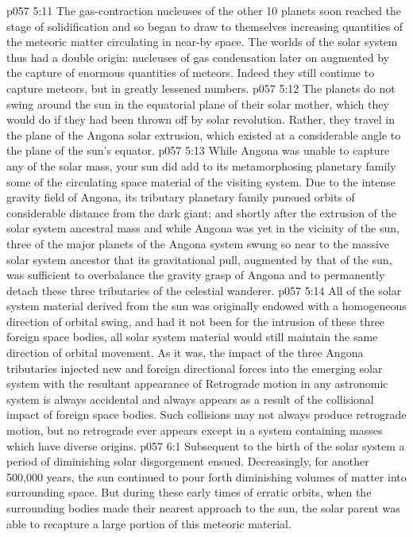 \vs p057 5:11 The gas\hyp{}contraction nucleuses of the other 10 planets soon reached the stage of solidification and so began to draw to themselves increasing quantities of the meteoric matter circulating in near\hyp{}by space. The worlds of the solar system thus had a double origin: nucleuses of gas condensation later on augmented by the capture of enormous quantities of meteors. Indeed they still continue to capture meteors, but in greatly lessened numbers.
\vs p057 5:12 The planets do not swing around the sun in the equatorial plane of their solar mother, which they would do if they had been thrown off by solar revolution. Rather, they travel in the plane of the Angona solar extrusion, which existed at a considerable angle to the plane of the sun’s equator.
\vs p057 5:13 \pc While Angona was unable to capture any of the solar mass, your sun did add to its metamorphosing planetary family some of the circulating space material of the visiting system. Due to the intense gravity field of Angona, its tributary planetary family pursued orbits of considerable distance from the dark giant; and shortly after the extrusion of the solar system ancestral mass and while Angona was yet in the vicinity of the sun, three of the major planets of the Angona system swung so near to the massive solar system ancestor that its gravitational pull, augmented by that of the sun, was sufficient to overbalance the gravity grasp of Angona and to permanently detach these three tributaries of the celestial wanderer.
\vs p057 5:14 All of the solar system material derived from the sun was originally endowed with a homogeneous direction of orbital swing, and had it not been for the intrusion of these three foreign space bodies, all solar system material would still maintain the same direction of orbital movement. As it was, the impact of the three Angona tributaries injected new and foreign directional forces into the emerging solar system with the resultant appearance of  Retrograde motion in any astronomic system is always accidental and always appears as a result of the collisional impact of foreign space bodies. Such collisions may not always produce retrograde motion, but no retrograde ever appears except in a system containing masses which have diverse origins.
\vs p057 6:1 Subsequent to the birth of the solar system a period of diminishing solar disgorgement ensued. Decreasingly, for another 500,000 years, the sun continued to pour forth diminishing volumes of matter into surrounding space. But during these early times of erratic orbits, when the surrounding bodies made their nearest approach to the sun, the solar parent was able to recapture a large portion of this meteoric material.
